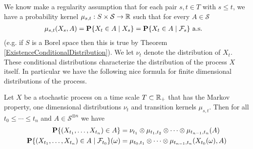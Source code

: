 We know make a regularity assumption that for each pair $s,t \in T$
with $s \leq t$, we
have a probability kernel $\mu_{s,t} : S \times \mathcal{S} \to
\reals$ such that for every $A \in \mathcal{S}$
\begin{align*}
\mu_{s,t}(X_s, A) &= \cprobability{X_s}{X_t \in A} =
\cprobability{\mathcal{F}_s}{X_t \in A} \text{ a.s.}
\end{align*}
(e.g. if $S$ is a Borel space then this is true by Theorem
\ref{ExistenceConditionalDistribution}).
We let $\nu_t$ denote the distribution of $X_t$.
These conditional distributions characterize the distribution of the
process $X$ itself.  In particular we have the following nice formula
for finite dimensional distributions of the process.
\begin{lem}\label{MarkovDistributions}Let $X$ be a stochastic process
  on a time scale $T \subset \reals_+$ that has the Markov property,
  one dimensional distributions $\nu_t$ and transition kernels
  $\mu_{s,t}$.  Then for all $t_0 \leq \cdots \leq t_n$ and $A \in
  \mathcal{S}^{\otimes n}$ we have
\begin{align*}
\probability{(X_{t_1}, \dots, X_{t_n}) \in A} 
&= \nu_{t_1} \otimes
\mu_{t_1, t_2} \otimes \cdots \otimes \mu_{t_{n-1},t_n}(A) \\
\cprobability{\mathcal{F}_{t_0}}{(X_{t_1}, \dots, X_{t_n}) \in
  A}(\omega) 
&= \mu_{t_0, t_1} \otimes \cdots \otimes \mu_{t_{n-1},t_n}(X_{t_0}(\omega),A) \\
\end{align*}
\end{lem}
